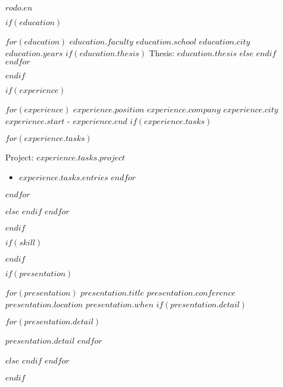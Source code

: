 \documentclass[$fontSize$, $format$]{awesome-cv}
\begin{document}
\makecvheader
\makecvfooter
  {$rodo.en$}
  {}
  {\thepage}

$if(education)$
\begin{cventries}
    $for(education)$
    \cventry
    {$education.faculty$}
    {$education.school$}
    {$education.city$}
    {$education.years$}
    $if(education.thesis)$
    {Thesis: \textit{$education.thesis$}}
    $else$
    {}
    $endif$
    \vspace{5pt}
    $endfor$
\end{cventries}
$endif$

$if(experience)$
\begin{cventries}
    $for(experience)$
    \cventry
    {$experience.position$}
    {$experience.company$}
    {$experience.city$}
    {$experience.start$ - $experience.end$}
    $if(experience.tasks)$
    {
        \begin{cvitems}
            $for(experience.tasks)$
            \item[]{
                \begin{scriptsize}Project: \textit{$experience.tasks.project$}\end{scriptsize}
                \begin{itemize}
                    $for(experience.tasks.entries)$
                    \item $experience.tasks.entries$
                    $endfor$
                \end{itemize}
            }
            $endfor$
        \end{cvitems}
        \vspace{5pt}
    }
    $else$
    {}
    $endif$
    $endfor$
\end{cventries}
$endif$

$if(skill)$
$endif$

$if(presentation)$
\pagebreak
{}
\begin{cventries}
    $for(presentation)$
    \cventry
        {$presentation.title$}
        {$presentation.conference$}
        {$presentation.location$}
        {$presentation.when$}
        $if(presentation.detail)$
        {
            \begin{cvitems}
            $for(presentation.detail)$
                \item{$presentation.detail$}
            $endfor$
            \end{cvitems}
        }
        $else$
        {}
        $endif$
    $endfor$
\end{cventries}
$endif$
\end{document}
